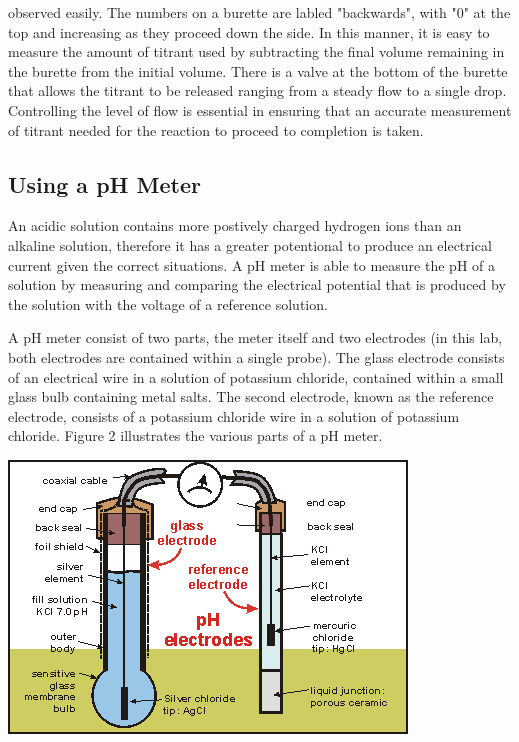 \documentclass{article}
\begin{document}
observed easily. The numbers on a burette are labled "backwards", with "0" at
the top and increasing as they proceed down the side. In this manner, it is easy
to measure the amount of titrant used by subtracting the final volume remaining
in the burette from the initial volume. There is a valve at the bottom of the
burette that allows the titrant to be released ranging from a steady flow to a
single drop. Controlling the level of flow is essential in ensuring that an
accurate measurement of titrant needed for the reaction to proceed to completion
is taken.

\subsection {Using a pH Meter}
An acidic solution contains more postively charged hydrogen ions than an
alkaline solution, therefore it has a greater potentional to produce an
electrical current given the correct situations. A pH meter is able to measure
the pH of a solution by measuring and comparing the electrical potential that is produced by
the solution with the voltage of a reference solution. 

A pH meter consist of two parts, the meter itself and two electrodes (in this
lab, both electrodes are contained within a single probe). The glass electrode
consists of an electrical wire in a solution of potassium chloride, contained
within a small glass bulb containing metal salts. The second electrode, known as
the reference electrode, consists of a potassium chloride wire in a solution of
potassium chloride. Figure 2 illustrates the various parts of a pH meter.
\cite{meter}

\begin{center}
        \includegraphics[scale=0.6]{meter}
\end{center}
\end{document}
